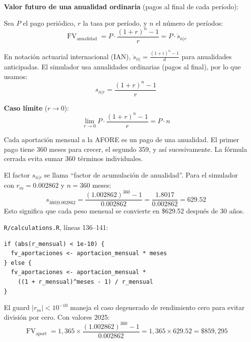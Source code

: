 \documentclass[11pt,a4paper]{report}
\theoremstyle{remark}
\DeclareMathOperator{\FV}{FV}
\begin{document}
\begin{tcolorbox}[colback=blue!5!white, colframe=blue!75!black, title=\textbf{Definici\'on Formal}]
\textbf{Valor futuro de una anualidad ordinaria} (pagos al final de cada per\'iodo):

Sea $P$ el pago peri\'odico, $r$ la tasa por per\'iodo, y $n$ el n\'umero de per\'iodos:
\begin{equation}
\FV_{\text{anualidad}} = P \cdot \frac{(1 + r)^n - 1}{r} = P \cdot \ddot{s}_{\overline{n}|r}
\label{eq:fv_annuity}
\end{equation}

En notaci\'on actuarial internacional (IAN), $\ddot{s}_{\overline{n}|} = \frac{(1+i)^n - 1}{d}$ para anualidades anticipadas. El simulador usa anualidades ordinarias (pagos al final), por lo que usamos:
\begin{equation}
s_{\overline{n}|r} = \frac{(1+r)^n - 1}{r}
\end{equation}

\textbf{Caso l\'imite} ($r \to 0$):
\begin{equation}
\lim_{r \to 0} P \cdot \frac{(1+r)^n - 1}{r} = P \cdot n
\end{equation}
\end{tcolorbox}

\begin{tcolorbox}[colback=green!5!white, colframe=green!50!black, title=\textbf{Intuici\'on}]
Cada aportaci\'on mensual a la AFORE es un pago de una anualidad. El primer pago tiene 360 meses para crecer, el segundo 359, y as\'i sucesivamente. La f\'ormula cerrada evita sumar 360 t\'erminos individuales.

El factor $s_{\overline{n}|r}$ se llama ``factor de acumulaci\'on de anualidad''. Para el simulador con $r_m = 0.002862$ y $n = 360$ meses:
\[
s_{\overline{360}|0.002862} = \frac{(1.002862)^{360} - 1}{0.002862} = \frac{1.8017}{0.002862} = 629.52
\]
Esto significa que cada peso mensual se convierte en \$629.52 despu\'es de 30 a\~nos.
\end{tcolorbox}

\begin{tcolorbox}[colback=orange!5!white, colframe=orange!75!black, title=\textbf{Aplicaci\'on en C\'odigo}]
\texttt{R/calculations.R}, l\'ineas 136--141:
\begin{lstlisting}
if (abs(r_mensual) < 1e-10) {
  fv_aportaciones <- aportacion_mensual * meses
} else {
  fv_aportaciones <- aportacion_mensual *
    ((1 + r_mensual)^meses - 1) / r_mensual
}
\end{lstlisting}

El guard $|r_m| < 10^{-10}$ maneja el caso degenerado de rendimiento cero para evitar divisi\'on por cero. Con valores 2025:
\[
\FV_{\text{aport}} = 1{,}365 \times \frac{(1.002862)^{360} - 1}{0.002862} = 1{,}365 \times 629.52 = \$859{,}295
\]
\end{tcolorbox}
\end{document}
